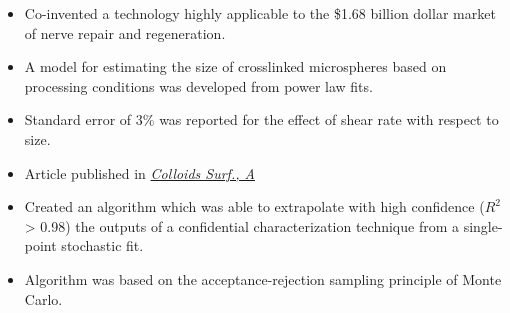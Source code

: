 \documentclass[10pt,a4paper,ragged2e]{altacv}
\begin{document}
\divider

\begin{itemize}
\item  Co-invented a technology highly applicable to the \$1.68 billion dollar market of nerve repair and regeneration.
\end{itemize}




\begin{itemize}
\item A model for estimating the size of crosslinked microspheres based on processing conditions was developed from power law fits.
\item Standard error of 3\% was reported for the effect of shear rate with respect to size.
\item Article published in \href{https://doi.org/10.1016/j.colsurfa.2017.05.058/}{\textit{Colloids Surf., A} }

\end{itemize}

\divider

\begin{itemize}
\item Created an algorithm which was able to extrapolate with high confidence ($R^2$ > 0.98) the outputs of a confidential characterization technique from a single-point stochastic fit.
\item Algorithm was based on the acceptance-rejection sampling principle of Monte Carlo.
\end{itemize}
\end{document}
